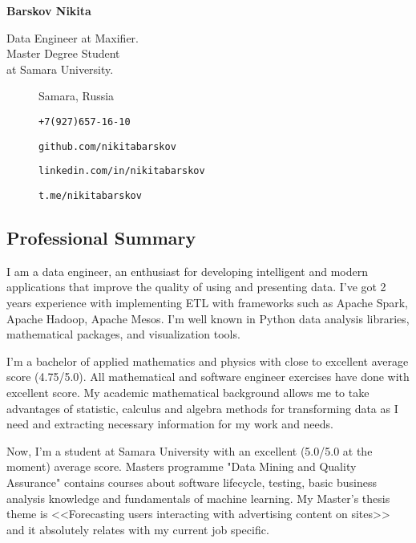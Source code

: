 \documentclass[12pt]{article}
\begin{document}
    \textbf{Barskov Nikita}
    \begin{multicols}{2}
        Data Engineer at Maxifier. \\
        Master Degree Student \\
        at Samara University.
        \begin{description}
            \item[\faMapPin] Samara, Russia
        \end{description}
        \columnbreak
        \begin{description}
            \item[\faPhone] \texttt{+7(927)657-16-10}
            \item[\faGithub] \texttt{github.com/nikitabarskov}
            \item[\faLinkedin] \texttt{linkedin.com/in/nikitabarskov}
            \item[\faPaperPlane] \texttt{t.me/nikitabarskov}
        \end{description}
    \end{multicols}
    \subsection*{Professional Summary}
    I am a data engineer, an enthusiast for developing intelligent and modern applications that improve the quality
    of using and presenting data. I've got 2 years experience with implementing ETL with frameworks such as
    Apache Spark, Apache Hadoop, Apache Mesos. I'm well known in Python data analysis libraries, mathematical packages,
    and visualization tools.

    I'm a bachelor of applied mathematics and physics with close to excellent average score (4.75/5.0). All mathematical
    and software engineer exercises have done with excellent score. My academic mathematical background allows me to
    take advantages of statistic, calculus and algebra methods for transforming data as I need and extracting necessary
    information for my work and needs.

    Now, I'm a student at Samara University with an excellent (5.0/5.0 at the moment) average score. Masters programme
    "Data Mining and Quality Assurance" contains courses about software lifecycle, testing, basic business analysis
    knowledge and fundamentals of machine learning. My Master's thesis theme is <<Forecasting users interacting with
    advertising content on sites>> and it absolutely relates with my current job specific.
\end{document}
